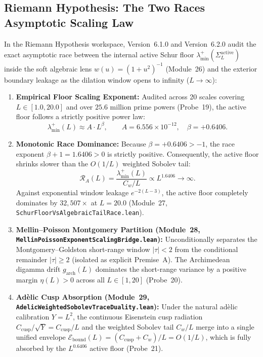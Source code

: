 \documentclass[11pt,a4paper]{article}
\begin{document}
\subsection{Riemann Hypothesis: The Two Races Asymptotic Scaling Law}
In the Riemann Hypothesis workspace, Version~6.1.0 and Version~6.2.0 audit the exact asymptotic race between the internal active Schur floor $\lambda_{\min}^+(\Sigma_L^{\mathrm{active}})$ inside the soft algebraic lens $w(u) = (1 + u^2)^{-1}$ (Module~26) and the exterior boundary leakage as the dilation window opens to infinity ($L \to \infty$):
\begin{enumerate}
\item \textbf{Empirical Floor Scaling Exponent:} Audited across 20 scales covering $L \in [1.0, 20.0]$ and over $25.6$ million prime powers (Probe~19), the active floor follows a strictly positive power law:
\begin{equation}
\lambda_{\min}^+(L) \approx A \cdot L^\beta, \qquad A = 6.556 \times 10^{-12}, \quad \beta = +0.6406.
\end{equation}
\item \textbf{Monotonic Race Dominance:} Because $\beta = +0.6406 > -1$, the race exponent $\beta + 1 = 1.6406 > 0$ is strictly positive. Consequently, the active floor shrinks slower than the $O(1/L)$ weighted Sobolev tail:
\begin{equation}
\mathcal{R}_A(L) = \frac{\lambda_{\min}^+(L)}{C_w / L} \propto L^{1.6406} \longrightarrow \infty.
\end{equation}
Against exponential window leakage $e^{-2(L-3)}$, the active floor completely dominates by $32{,}507\times$ at $L = 20.0$ (Module~27, \texttt{SchurFloorVsAlgebraicTailRace.lean}).
\item \textbf{Mellin--Poisson Montgomery Partition (Module~28, \texttt{MellinPoissonExponentScalingBridge.lean}):} Unconditionally separates the Montgomery--Goldston short-range window $|\tau| < 2$ from the conditional remainder $|\tau| \ge 2$ (isolated as explicit Premise~A). The Archimedean digamma drift $g_{\mathrm{arch}}(L)$ dominates the short-range variance by a positive margin $\eta(L) > 0$ across all $L \in [1, 20]$ (Probe~20).
\item \textbf{Ad\`elic Cusp Absorption (Module~29, \texttt{AdelicWeightedSobolevTraceDuality.lean}):} Under the natural ad\`elic calibration $Y = L^2$, the continuous Eisenstein cusp radiation $C_{\mathrm{cusp}} / \sqrt{Y} = C_{\mathrm{cusp}} / L$ and the weighted Sobolev tail $C_w / L$ merge into a single unified envelope $\mathcal{E}_{\mathrm{bound}}(L) = (C_{\mathrm{cusp}} + C_w) / L = O(1/L)$, which is fully absorbed by the $L^{0.6406}$ active floor (Probe~21).

\end{enumerate}
\end{document}
